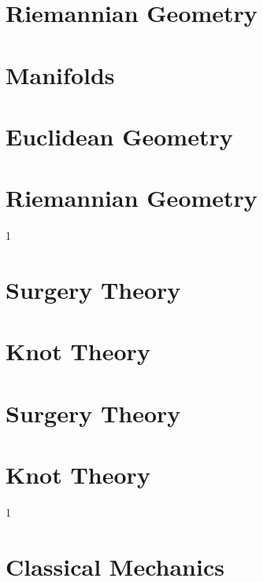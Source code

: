 \documentclass{book}                                                           %
\newcommand*{\TOPPATH}{books}
\newcommand*{\PATH}{\TOPPATH/}
\newcounter{endpage}
\def\compilegeotop{0}
\def\compilephysics{0}
\begin{document}
        \part{Riemannian Geometry}
            
    \else
        \part{Manifolds}
        \part{Euclidean Geometry}
        \part{Riemannian Geometry}
    \fi
    \clearpage

    \setcounter{endpage}{\thepage}
    \label{book:Geometric_Topology}%
    \renewcommand{\PATH}{\TOPPATH/Geometric_Topology}
    \setcounter{page}{\value{endpage}}

    \if\compilegeotop1
        \part{Surgery Theory}
            
        \part{Knot Theory}
            
    \else
        \part{Surgery Theory}
        \part{Knot Theory}
    \fi
    \clearpage

    \setcounter{endpage}{\thepage}
    \label{book:Physics}
    \renewcommand{\PATH}{\TOPPATH/Physics}
    \setcounter{page}{\value{endpage}}

    \if\compilephysics1
        \part{Classical Mechanics}
            
\end{document}
